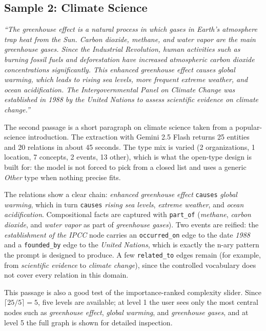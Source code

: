 \documentclass[11pt,a4paper]{article}
\begin{document}
\subsection{Sample 2: Climate Science}

\emph{``The greenhouse effect is a natural process in which gases in Earth's atmosphere trap heat from the Sun. Carbon dioxide, methane, and water vapor are the main greenhouse gases. Since the Industrial Revolution, human activities such as burning fossil fuels and deforestation have increased atmospheric carbon dioxide concentrations significantly. This enhanced greenhouse effect causes global warming, which leads to rising sea levels, more frequent extreme weather, and ocean acidification. The Intergovernmental Panel on Climate Change was established in 1988 by the United Nations to assess scientific evidence on climate change.''}

The second passage is a short paragraph on climate science taken from a popular-science introduction. The extraction with Gemini 2.5 Flash returns 25 entities and 20 relations in about 45 seconds. The type mix is varied (2 organizations, 1 location, 7 concepts, 2 events, 13 other), which is what the open-type design is built for: the model is not forced to pick from a closed list and uses a generic \emph{Other} type when nothing precise fits.

The relations show a clear chain: \emph{enhanced greenhouse effect} \texttt{causes} \emph{global warming}, which in turn \texttt{causes} \emph{rising sea levels}, \emph{extreme weather}, and \emph{ocean acidification}. Compositional facts are captured with \texttt{part\_of} (\emph{methane}, \emph{carbon dioxide}, and \emph{water vapor} as part of \emph{greenhouse gases}). Two events are reified: the \emph{establishment of the IPCC} node carries an \texttt{occurred\_on} edge to the date \emph{1988} and a \texttt{founded\_by} edge to the \emph{United Nations}, which is exactly the n-ary pattern the prompt is designed to produce. A few \texttt{related\_to} edges remain (for example, from \emph{scientific evidence} to \emph{climate change}), since the controlled vocabulary does not cover every relation in this domain.

This passage is also a good test of the importance-ranked complexity slider. Since $\lceil 25/5 \rceil = 5$, five levels are available; at level 1 the user sees only the most central nodes such as \emph{greenhouse effect}, \emph{global warming}, and \emph{greenhouse gases}, and at level 5 the full graph is shown for detailed inspection.
\end{document}
